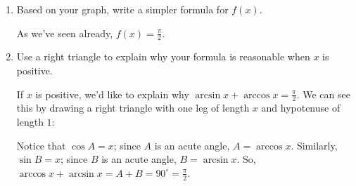 \documentclass{article}
\begin{document}
\begin{enumerate}
\begin{enumerate}
\begin{solution}
      By definition, $f(0) = \arcsin 0 + \arccos 0 = 0 + \frac{\pi}{2} =
      \frac{\pi}{2}$.  So, $f(x)$ is the constant function $\frac{\pi}{2}$
      with domain $[-1, 1]$:
      \begin{center}
      \end{center}
    \end{solution}

  \item
    \begin{problem}[\vfill]
      Based on your graph, write a simpler formula for $f(x)$.  
    \end{problem}

    \begin{solution}
      As we've seen already, $f(x) = \boxed{\frac{\pi}{2}}$.  
    \end{solution}

  \item
    \begin{problem}[\nstretch{2}]
      Use a right triangle to explain why your formula is reasonable when
      $x$ is positive.
    \end{problem}

    \begin{solution}
      If $x$ is positive, we'd like to explain why $\arcsin x + \arccos x
      = \frac{\pi}{2}$.  We can see this by drawing a right triangle with
      one leg of length $x$ and hypotenuse of length $1$:
      \begin{center}
      \end{center}
      Notice that $\cos A = x$; since $A$ is an acute angle, $A = \arccos
      x$.  Similarly, $\sin B = x$; since $B$ is an acute angle, $B =
      \arcsin x$.  So, $\arccos x + \arcsin x = A + B = 90^\circ =
      \frac{\pi}{2}$.
    \end{solution}


\end{enumerate}
\end{enumerate}
\end{document}
